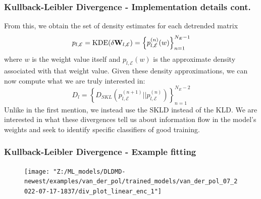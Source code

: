 \documentclass[11pt,aspectratio=169]{beamer}
\newcommand{\parens}[1]{\left(#1\right)}
\newcommand{\bracks}[1]{\left\{#1\right\}}
\begin{document}
    \begin{frame}
        \frametitle{Kullback-Leibler Divergence - Implementation details cont.}
        From this, we obtain the set of density estimates for each detrended 
        matrix
        \begin{equation}
            p_{l,\mathcal{E}} = \text{KDE}(\delta{\bf W}_{l, \mathcal{E}}) = \bracks{p_{l,\mathcal{E}}^{(n)}(w)}_{n=1}^{N_E-1}
        \end{equation}
        where $w$ is the weight value itself and $p_{l,\mathcal{E}}(w)$ is the approximate density associated 
        with that weight value. Given these density approximations, we 
        can now compute what we are truly interested in:
        \begin{equation}
            D_l = \bracks{D_{SKL}\parens{p_{l,\mathcal{E}}^{(n+1)} \Big|\!\Big| p_{l,\mathcal{E}}^{(n)}}}_{n=1}^{N_E-2}
        \end{equation}
        Unlike in the first mention, we instead use the SKLD instead of the KLD.
        We are interested in what these divergences tell us about information flow in the model's weights and 
        seek to identify specific classifiers of good training. 
    \end{frame}


    \begin{frame}
        \frametitle{Kullback-Leibler Divergence - Example fitting}
        \begin{figure}
            \centering
            \texttt{[image: "Z:/ML\_models/DLDMD-newest/examples/van\_der\_pol/trained\_models/van\_der\_pol\_07\_2022-07-17-1837/div\_plot\_linear\_enc\_1"]}
        \end{figure}
    \end{frame}
\end{document}
